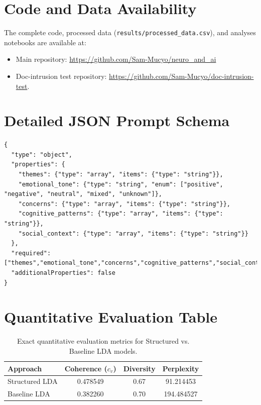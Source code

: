 \documentclass{article}
\begin{document}
\section*{Code and Data Availability}
The complete code, processed data (\texttt{results/processed\_data.csv}), and analyses notebooks are available at:

\begin{itemize}
    \item Main repository: \url{https://github.com/Sam-Mucyo/neuro_and_ai}
    \item Doc-intrusion test repository: \url{https://github.com/Sam-Mucyo/doc-intrusion-test}.
\end{itemize}






\appendix
\section{Detailed JSON Prompt Schema}
\label{app:prompt-schema}
\begin{verbatim}
{
  "type": "object",
  "properties": {
    "themes": {"type": "array", "items": {"type": "string"}},
    "emotional_tone": {"type": "string", "enum": ["positive", "negative", "neutral", "mixed", "unknown"]},
    "concerns": {"type": "array", "items": {"type": "string"}},
    "cognitive_patterns": {"type": "array", "items": {"type": "string"}},
    "social_context": {"type": "array", "items": {"type": "string"}}
  },
  "required": ["themes","emotional_tone","concerns","cognitive_patterns","social_context"],
  "additionalProperties": false
}
\end{verbatim}

\section{Quantitative Evaluation Table}
\label{app:metrics}
\begin{table}[ht]
    \centering
    \begin{tabular}{lccc}
        \hline
        Approach       & Coherence ($c_v$) & Diversity & Perplexity \\
        \hline
        Structured LDA & 0.478549          & 0.67      & 91.214453  \\
        Baseline LDA   & 0.382260          & 0.70      & 194.484527 \\
        \hline
    \end{tabular}
    \caption{Exact quantitative evaluation metrics for Structured vs. Baseline LDA models.}
    \label{tab:metrics-app}
\end{table}
\end{document}
